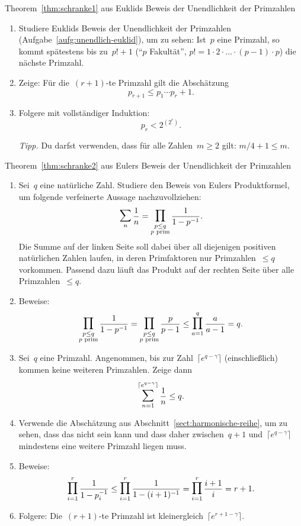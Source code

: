 \documentclass[twoside]{../zirkelblatt1415}
\theoremstyle{definition}
\theoremstyle{plain}
\theoremstyle{remark}
\newcommand{\prim}[1]{\text{\textnormal{$#1$ prim}}}
\newcommand{\bigsum}{\mathop{\mathlarger{\mathlarger{\sum}}}}
\newcommand{\bigprod}{\mathop{\mathlarger{\mathlarger{\prod}}}}
\begin{document}
\begin{aufgabe}{Theorem~\ref{thm:schranke1} aus Euklids Beweis der
Unendlichkeit der Primzahlen}
\begin{enumerate}
\item Studiere Euklids Beweis der Unendlichkeit der Primzahlen
(Aufgabe~\ref{aufg:unendlich-euklid}), um zu sehen: Ist~$p$ eine Primzahl, so
kommt spätestens bis zu~$p! + 1$ ("`$p$ Fakultät"', $p! = 1 \cdot 2 \cdot
\ldots \cdot (p-1) \cdot p$) die nächste Primzahl.
\item Zeige: Für die~$(r+1)$-te Primzahl gilt die Abschätzung
\[ p_{r+1} \leq p_1 \cdots p_r + 1. \]
\item Folgere mit vollständiger Induktion:
\[ p_r < 2^{(2^r)}. \]

\emph{Tipp.} Du darfst verwenden, dass für alle Zahlen~$m \geq 2$ gilt: $m/4 +
1 \leq m$.
\end{enumerate}\fixlistspacing
\end{aufgabe}

\begin{aufgabe}{Theorem~\ref{thm:schranke2} aus Eulers Beweis der
Unendlichkeit der Primzahlen}
\begin{enumerate}
\item Sei~$q$ eine natürliche Zahl. Studiere den Beweis von Eulers
Produktformel, um folgende verfeinerte Aussage nachzuvollziehen:
\[ \bigsum_n \frac{1}{n} = \bigprod_{\substack{p \leq q \\ \prim{p}}} \frac{1}{1 -
p^{-1}}. \]
Die Summe auf der linken Seite soll dabei über all diejenigen positiven
natürlichen Zahlen laufen, in deren Primfaktoren nur Primzahlen~$\leq q$
vorkommen. Passend dazu läuft das Produkt auf der rechten Seite über alle
Primzahlen~$\leq q$.
\item Beweise:
\[
  \bigprod_{\substack{p \leq q \\ \prim{p}}} \frac{1}{1 - p^{-1}} =
  \bigprod_{\substack{p \leq q \\ \prim{p}}} \frac{p}{p - 1} \leq
  \bigprod_{a=1}^q \frac{a}{a - 1} = q. \]
\item Sei~$q$ eine Primzahl. Angenommen, bis zur Zahl~$\lceil e^{q-\gamma}
\rceil$ (einschließlich) kommen keine weiteren Primzahlen. Zeige dann
\[ \bigsum_{n=1}^{\lceil e^{q-\gamma} \rceil} \frac{1}{n} \leq q. \]
\item Verwende die Abschätzung aus Abschnitt~\ref{sect:harmonische-reihe}, um
zu sehen, dass das nicht sein kann und dass daher zwischen~$q+1$ und~$\lceil
e^{q-\gamma} \rceil$ mindestens eine weitere Primzahl liegen muss.
\item Beweise:
\[
  \bigprod_{i=1}^r \frac{1}{1 - p_i^{-1}} \leq
  \bigprod_{i=1}^r \frac{1}{1 - (i+1)^{-1}} =
  \bigprod_{i=1}^r \frac{i+1}{i} = r+1. \]
\item Folgere: Die~$(r+1)$-te Primzahl ist kleinergleich~$\lceil e^{r+1-\gamma} \rceil$.
\end{enumerate}\fixlistspacing
\end{aufgabe}
\end{document}
